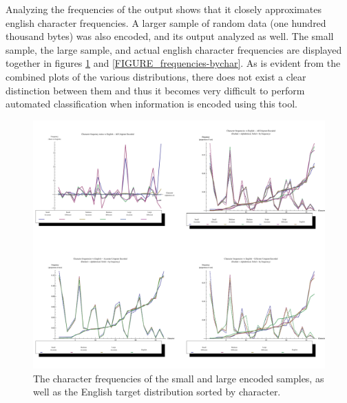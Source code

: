 \documentclass[12pt]{report}
\theoremstyle{remark}
\theoremstyle{definition}
\theoremstyle{definition}
\theoremstyle{definition}
\begin{document}
\begin{appendices}
Analyzing the frequencies of the output shows that it closely approximates english character frequencies. A larger sample of random data (one hundred thousand bytes) was also encoded, and its output analyzed as well. The small sample, the large sample, and actual english character frequencies are displayed together in figures \ref{FIGURE_frequencies-bytop} and \ref{FIGURE_frequencies-bychar}. As is evident from the combined plots of the various distributions, there does not exist a clear distinction between them and thus it becomes very difficult to perform automated classification when information is encoded using this tool.

\newpage

\begin{landscape}
\begin{figure}
\centering
\includegraphics[width=1.15\textwidth]{figures/plots_unigram.pdf}
\caption[Plot of character frequencies by frequency]{The character frequencies of the small and large encoded samples, as well as the English target distribution sorted by character.}
\label{FIGURE_frequencies-bytop}
\end{figure}
\end{landscape}

\newpage



\end{appendices}
\end{document}
